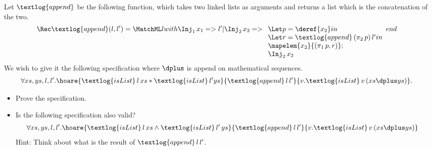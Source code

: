 \begin{exercise}
  Let $\textlog{append}$ be the following function, which takes two linked lists
  as arguments and returns a list which is the concatenation of the two.
  \begin{align*}
    \Rec \textlog{append}(l,l')=\MatchML l with
    \Inj_1\, x_1=>l'
    | \Inj_2\, x_2=>
    \begin{array}[t]{l}
      \Let p=\deref{x_2} in \\
      \Let r=\textlog{append}\, (\pi_2\, p)\, l' in \\
      \mapelem{x_2}{(\pi_1\, p, r)}; \\
      \Inj_2\, x_2
    \end{array}
    end {}
  \end{align*}
  We wish to give it the following specification where $\dplus$ is append on
  mathematical sequences.
  \begin{align*}
    \forall xs, ys, l, l'.
    \hoare{\textlog{isList}\, l\, xs * \textlog{isList}\, l' ys}
    {\textlog{append}\, l\, l'}{v. \textlog{isList}\, v\, (xs \dplus ys)}.
  \end{align*}
  \begin{itemize}
    \item Prove the specification.
    \item Is the following specification also valid?
      \begin{align*}
        \forall xs, ys, l, l'.
        \hoare{\textlog{isList}\, l\, xs \wedge \textlog{isList}\, l'\, ys}
        {\textlog{append}\, l\, l'}{v. \textlog{isList}\, v\, (xs \dplus ys)}
      \end{align*}
      Hint: Think about what is the result of $\textlog{append}\, l\, l'$.
  \end{itemize}
\end{exercise}

